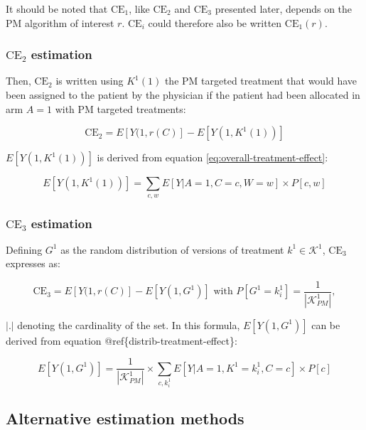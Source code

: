 \documentclass[a4paper,12pt,twoside,onecolumn,openright,final,oldfontcommands]{memoir}
\begin{document}
It should be noted that \(\text{CE}_1\), like \(\text{CE}_2\) and
\(\text{CE}_3\) presented later, depends on the PM algorithm of interest
\(r\). \(\text{CE}_i\) could therefore also be written
\(\text{CE}_1(r)\).

\subsubsection{\texorpdfstring{\(\text{CE}_2\)
estimation}{\textbackslash{}text\{CE\}\_2 estimation}}\label{textce_2-estimation}

Then, \(\text{CE}_2\) is written using \(K^1(1)\) the PM targeted
treatment that would have been assigned to the patient by the physician
if the patient had been allocated in arm \(A=1\) with PM targeted
treatments:

\begin{equation}
\text{CE}_2 = E[Y(1, r(C)] - E[Y(1, K^1(1))]
\label{eq:CE2}
\end{equation}

\(E[Y(1, K^1(1))]\) is derived from equation
\eqref{eq:overall-treatment-effect}:

\[E[Y(1, K^1(1))] = \sum_{c,w} E[Y | A=1, C=c, W=w] \times P[c,w]\]

\subsubsection{\texorpdfstring{\(\text{CE}_3\)
estimation}{\textbackslash{}text\{CE\}\_3 estimation}}\label{textce_3-estimation}

Defining \(G^1\) as the random distribution of versions of treatment
\(k^1 \in \mathcal{K}^{1}\), \(\text{CE}_3\) expresses as:

\begin{equation}
\text{CE}_3 = E[Y(1, r(C)] - E[Y(1, G^1)] \text{ with } P[G^1=k^1_i]=\dfrac{1}{|\mathcal{K}^1_{PM}|},
\label{eq:CE3}
\end{equation}

\(|.|\) denoting the cardinality of the set. In this formula,
\(E[Y(1, G^1)]\) can be derived from equation
@ref\{distrib-treatment-effect\}:

\[E[Y(1, G^1)] = \dfrac{1}{|\mathcal{K}^1_{PM}|} \times \sum_{c,k^1_i} E[Y | A=1, K^1=k^1_i, C=c] \times P[c]\]

\subsection{Alternative estimation methods}\label{PM-others}
\end{document}
